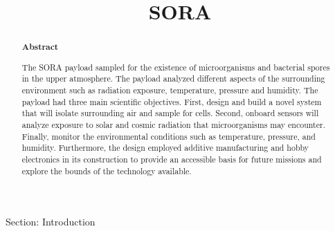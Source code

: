 \documentclass[aps,superscriptaddress,floatfix,nofootinbib,showpacs,amsmath,amssymb,altaffilletter,floatfix,linenumbers]{revtex4-1}
\begin{document}
\title{SORA}

\begin{abstract}
\begin{center}
{\bf Abstract}
\end{center}
The SORA payload sampled for the existence of microorganisms and bacterial spores in the upper atmosphere. The payload analyzed different aspects of the surrounding environment such as radiation exposure, temperature, pressure and humidity. The payload had three main scientific objectives. First, design and build a novel system that will isolate surrounding air and sample for cells. Second, onboard sensors will analyze exposure to solar and cosmic radiation that microorganisms may encounter. Finally, monitor the environmental conditions such as temperature, pressure, and humidity. Furthermore, the design employed additive manufacturing and hobby electronics in its construction to provide an accessible basis for future missions and explore the bounds of the technology available.
\end{abstract}


\setlength{\parindent}{1em}
\setdefaultleftmargin{1em}{1em}{}{}{}{}
\setcounter{page}{0}\thispagestyle{empty}
\maketitle
\tableofcontents
\setcounter{page}{0}\thispagestyle{empty}
\newpage
Section: Introduction




%
\clearpage


\end{document}
